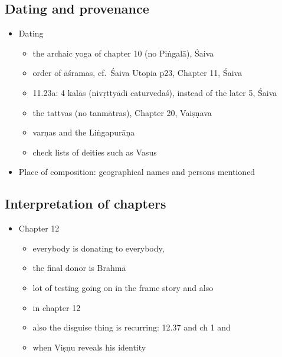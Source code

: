 \documentclass[12pt]{book}
\begin{document}
{%
\subsection{Dating and provenance}\label{dating-and-provenance}}

\begin{itemize}

\item
  Dating

  \begin{itemize}
  
  \item
    the archaic yoga of chapter 10 (no Piṅgalā), Śaiva
  \item
    order of āśramas, cf.~Śaiva Utopia p23, Chapter 11, Śaiva
  \item
    11.23a: 4 kalās (nivṛttyādi caturvedaś), instead of the later 5,
    Śaiva
  \item
    the tattvas (no tanmātras), Chapter 20, Vaiṣṇava
  \item
    varṇas and the Liṅgapurāṇa
  \item
    check lists of deities such as Vasus
  \end{itemize}
\item
  Place of composition: geographical names and persons mentioned
\end{itemize}

{%
\subsection{Interpretation of
chapters}\label{interpretation-of-chapters}}

\begin{itemize}

\item
  Chapter 12

  \begin{itemize}
  
  \item
    everybody is donating to everybody,
  \item
    the final donor is Brahmā
  \item
    lot of testing going on in the frame story and also
  \item
    in chapter 12
  \item
    also the disguise thing is recurring: 12.37 and ch 1 and
  \item
    when Viṣṇu reveals his identity
  \end{itemize}
\end{itemize}
\end{document}
